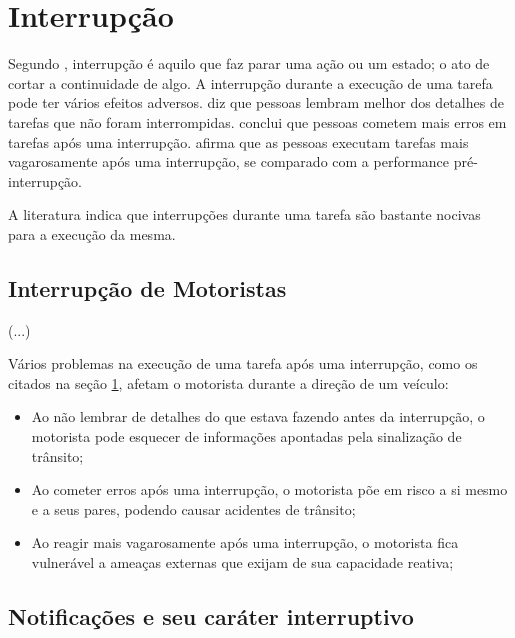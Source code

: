 \section{Interrupção}
\label{interrupcao}

Segundo \cite{ferreira2004novo}, interrupção é aquilo que faz parar uma ação ou um estado; o ato de cortar a continuidade de
algo. A interrupção durante a execução de uma tarefa pode ter vários efeitos adversos. \cite{lewin1927untersuchungen} diz
que pessoas lembram melhor dos detalhes de tarefas que não foram interrompidas. \cite{zijlstra1999temporal} conclui que
pessoas cometem mais erros em tarefas após uma interrupção. \cite{gillie1989makes} afirma que as pessoas executam tarefas
mais vagarosamente após uma interrupção, se comparado com a performance pré-interrupção.

A literatura indica que interrupções durante uma tarefa são bastante nocivas para a execução da mesma.

\subsection{Interrupção de Motoristas}
\label{interrupcao-motoristas}

(...)

Vários problemas na execução de uma tarefa após uma interrupção, como os citados na seção \ref{interrupcao}, afetam o
motorista durante a direção de um veículo:

\begin{itemize}
  \item Ao não lembrar de detalhes do que estava fazendo antes da interrupção, o motorista pode esquecer de informações
  apontadas pela sinalização de trânsito;
  \item Ao cometer erros após uma interrupção, o motorista põe em risco a si mesmo e a seus pares, podendo causar acidentes
  de trânsito;
  \item Ao reagir mais vagarosamente após uma interrupção, o motorista fica vulnerável a ameaças externas que exijam de sua
  capacidade reativa;
\end{itemize}


\subsection{Notificações e seu caráter interruptivo}
\label{notificacao}

